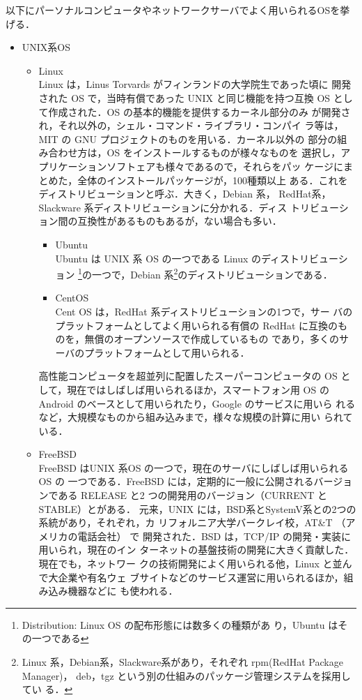 以下にパーソナルコンピュータやネットワークサーバでよく用いられるOSを挙げる．
\begin{itemize}
  \item UNIX系OS
  \begin{itemize}
    \item Linux\\
	  Linux は，Linus Torvards がフィンランドの大学院生であった頃に
	  開発された OS で，当時有償であった UNIX と同じ機能を持つ互換
	  OS として作成された．OS の基本的機能を提供するカーネル部分のみ
	  が開発され，それ以外の，シェル・コマンド・ライブラリ・コンパイ
	  ラ等は，MIT の GNU プロジェクトのものを用いる．カーネル以外の
	  部分の組み合わせ方は，OS をインストールするものが様々なものを
	  選択し，アプリケーションソフトェアも様々であるので，それらをパッ
	  ケージにまとめた，全体のインストールパッケージが，100種類以上
	  ある．これをディストリビューションと呼ぶ．大きく，Debian 系，
	  RedHat系，Slackware 系ディストリビューションに分かれる．ディス
	  トリビューション間の互換性があるものもあるが，ない場合も多い．
	  \begin{itemize}
	   \item Ubuntu\\
		 Ubuntu は UNIX 系 OS の一つである Linux のディストリビューション
		 \footnote{Distribution: Linux OS の配布形態には数多くの種類があ
		 り，Ubuntu はその一つである}の一つで，Debian 系\footnote{Linux
		 系，Debian系，Slackware系があり，それぞれ rpm(RedHat Package Manager)，
		 deb，tgz という別の仕組みのパッケージ管理システムを採用してい
		 る．}のディストリビューションである．
	   \item CentOS\\
		 Cent OS は，RedHat 系ディストリビューションの1つで，サー
		 バのプラットフォームとしてよく用いられる有償の RedHat
		 に互換のものを，無償のオープンソースで作成しているもの
		 であり，多くのサーバのプラットフォームとして用いられる．
	  \end{itemize}
	  高性能コンピュータを超並列に配置したスーパーコンピュータの OS
	  として，現在ではしばしば用いられるほか，スマートフォン用 OS の
	  Android のベースとして用いられたり，Google のサービスに用いら
	  れるなど，大規模なものから組み込みまで，様々な規模の計算に用い
	  られている．

    \item FreeBSD\\
      FreeBSD はUNIX 系OS の一つで，現在のサーバにしばしば用いられるOS の
      一つである．FreeBSD には，定期的に一般に公開されるバージョンである
      RELEASE と2 つの開発用のバージョン（CURRENT とSTABLE）とがある．
      元来，UNIX には，BSD系とSystemV系との2つの系統があり，それぞれ，カ
	  リフォルニア大学バークレイ校，AT\&T （アメリカの電話会社） で
	  開発された．BSD は，TCP/IP の開発・実装に用いられ，現在のイン
	  ターネットの基盤技術の開発に大きく貢献した．現在でも，ネットワー
	  クの技術開発によく用いられる他，Linux と並んで大企業や有名ウェ
	  ブサイトなどのサービス運営に用いられるほか，組み込み機器などに
	  も使われる．
  

\end{itemize}
\end{itemize}
